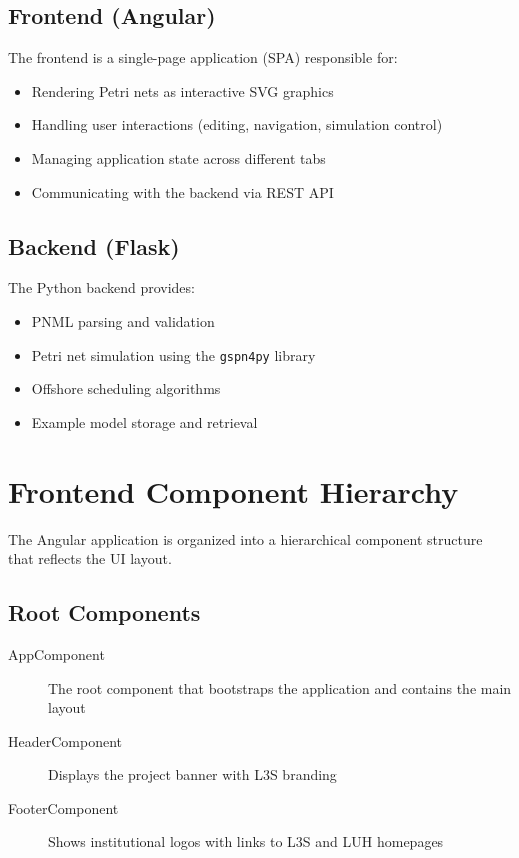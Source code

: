 \subsection{Frontend (Angular)}

The frontend is a single-page application (SPA) responsible for:
\begin{itemize}
    \item Rendering Petri nets as interactive SVG graphics
    \item Handling user interactions (editing, navigation, simulation control)
    \item Managing application state across different tabs
    \item Communicating with the backend via REST API
\end{itemize}

\subsection{Backend (Flask)}

The Python backend provides:
\begin{itemize}
    \item PNML parsing and validation
    \item Petri net simulation using the \texttt{gspn4py} library
    \item Offshore scheduling algorithms
    \item Example model storage and retrieval
\end{itemize}

\section{Frontend Component Hierarchy}
\label{sec:component-hierarchy}

The Angular application is organized into a hierarchical component structure that reflects the UI layout.

\subsection{Root Components}

\begin{description}
    \item[AppComponent] The root component that bootstraps the application and contains the main layout
    \item[HeaderComponent] Displays the project banner with L3S branding
    \item[FooterComponent] Shows institutional logos with links to L3S and LUH homepages
\end{description}

